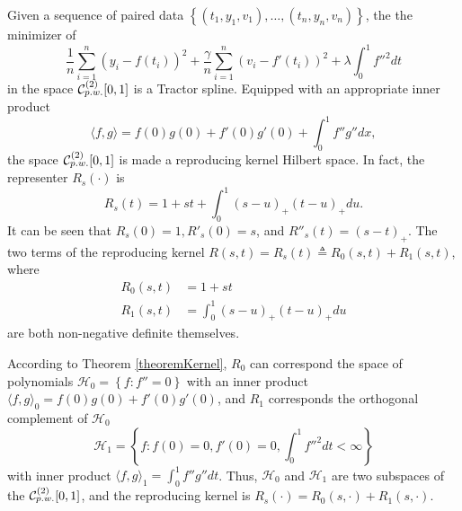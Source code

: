 Given a sequence of paired data $\left\lbrace (t_1,y_1,v_1),\ldots, (t_n,y_n,v_n) \right\rbrace$, the the minimizer of 
\begin{equation}\label{maineq}
\frac{1}{n}\sum_{i=1}^{n}(y_i-f(t_i))^2+\frac{\gamma}{n}\sum_{i=1}^{n}(v_i-f'(t_i))^2+\lambda \int_{0}^{1}f''^2dt
\end{equation}
in the space $\mathcal{C}_{\footnotesize p.w.}^{(2)}[0,1]$ is a Tractor spline. Equipped with an appropriate inner product
\begin{equation}\label{TractorSplineInnerProduct}
\langle f,g \rangle=f(0) g(0)+f'(0) g'(0)+\int_{0}^{1}f''g''dx,
\end{equation}
the space $\mathcal{C}_{\footnotesize p.w.}^{(2)}[0,1]$ is made a reproducing kernel Hilbert space. In fact, the representer $R_s(\cdot)$ is 
\begin{equation}\label{kerneleq}
R_s(t)=1+st+\int_{0}^{1} (s-u)_+(t-u)_+du.
\end{equation}
It can be seen that $R_s(0)=1, R'_s(0)=s$, and $R''_s(t)=(s-t)_+$. The two terms of the reproducing kernel $R(s,t)=R_s(t)\triangleq R_0(s,t)+R_1(s,t)$, where
\begin{align*} %
R_0(s,t)&=1+st \\ %
R_1(s,t)&=\int_{0}^{1} (s-u)_+(t-u)_+du
\end{align*}
are both non-negative definite themselves.


According to Theorem \ref{theoremKernel}, $R_0$ can correspond the space of polynomials $\mathcal{H}_0=\left\lbrace f:f''=0\right\rbrace$ with an inner product $\langle f,g \rangle_0= f(0)g(0)+f'(0)g'(0)$, and $R_1$ corresponds the orthogonal complement of $\mathcal{H}_0$
\begin{equation*}
\mathcal{H}_1=\left\lbrace f:f(0)=0, f'(0)=0, \int_{0}^{1}f''^2dt<\infty\right\rbrace
\end{equation*}
with inner product $\langle f,g \rangle_1=\int_{0}^{1}f''g''dt$. Thus, $\mathcal{H}_0$ and $\mathcal{H}_1$ are two subspaces of the $\mathcal{C}_{\footnotesize p.w.}^{(2)}[0,1]$, and the reproducing kernel is $R_s(\cdot) = R_0(s,\cdot)+R_1(s,\cdot)$.


